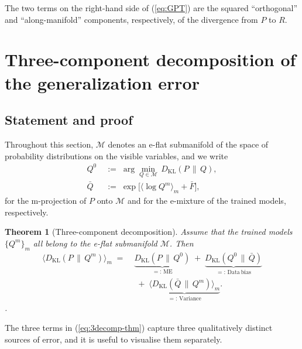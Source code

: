 \documentclass[11pt,a4paper]{article}
\newtheorem{theorem}{Theorem}
\theoremstyle{definition}
\theoremstyle{remark}
\newcommand{\KL}{D_{\mathrm{KL}}}
\newcommand{\PV}{P}
\newcommand{\QVz}{Q^{0}}
\newcommand{\QVm}{Q^{m}}
\newcommand{\QVbar}{\bar{Q}}
\newcommand{\Mfam}{\mathcal{M}}
\begin{document}
The two terms on the right-hand side of (\ref{eq:GPT}) are the squared
``orthogonal'' and ``along-manifold'' components, respectively, of the
divergence from $P$ to $R$.

\section{Three-component decomposition of the generalization error}
\label{sec:decomp}

\subsection{Statement and proof}

Throughout this section, $\Mfam$ denotes an e-flat submanifold of the
space of probability distributions on the visible variables, and we
write
\begin{align}
  \QVz &\;:=\; \arg\min_{Q \in \Mfam}\, \KL(\PV \,\|\, Q),
  \nonumber \\
  \QVbar &\;:=\; \exp\!\Big[\big\langle\log \QVm\big\rangle_{m} + \bar F\Big],
  \label{eq:QVzQVbar}
\end{align}
for the m-projection of $\PV$ onto $\Mfam$ and for the e-mixture of
the trained models, respectively.

\begin{theorem}[Three-component decomposition]
\label{thm:3decomp}
Assume that the trained models $\{\QVm\}_{m}$ all belong to the
e-flat submanifold $\Mfam$. Then
\begin{align}
  \big\langle \KL(\PV \,\|\, \QVm) \big\rangle_{m}
  \;=\;
  & \underbrace{\KL(\PV \,\|\, \QVz)}_{=:\,\mathrm{ME}}
  \;+\;
  \underbrace{\KL(\QVz \,\|\, \QVbar)}_{=:\,\mathrm{Data\ bias}}
  \nonumber \\
  & \;+\;
  \underbrace{\big\langle \KL(\QVbar \,\|\, \QVm) \big\rangle_{m}}_{=:\,\mathrm{Variance}}.
  \label{eq:3decomp-thm}
\end{align}.
\end{theorem}

The three terms in (\ref{eq:3decomp-thm}) capture three
qualitatively distinct sources of error, and it is useful to
visualise them separately.
\end{document}
